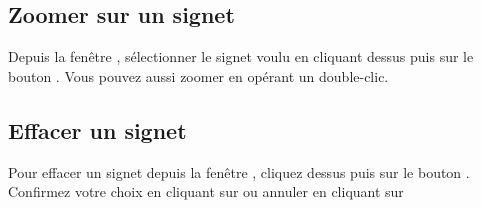\subsection{Zoomer sur un signet}
Depuis la fenêtre , sélectionner le signet voulu en cliquant dessus puis sur le bouton . Vous pouvez aussi zoomer en opérant un double-clic.

\subsection{Effacer un signet}
Pour effacer un signet depuis la fenêtre , cliquez dessus puis sur le bouton .
Confirmez votre choix en cliquant sur  ou annuler en cliquant sur 
